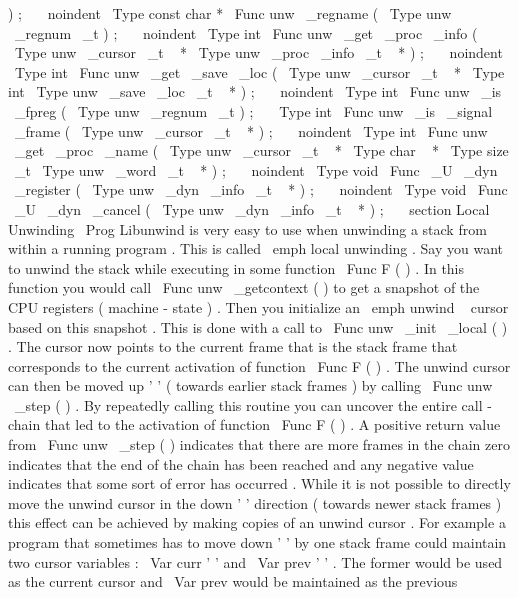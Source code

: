 )
;
\
\
\
noindent
\
Type
{
const
char
*
}
\
Func
{
unw
\
_regname
}
(
\
Type
{
unw
\
_regnum
\
_t
}
)
;
\
\
\
noindent
\
Type
{
int
}
\
Func
{
unw
\
_get
\
_proc
\
_info
}
(
\
Type
{
unw
\
_cursor
\
_t
~
*
}
\
Type
{
unw
\
_proc
\
_info
\
_t
~
*
}
)
;
\
\
\
noindent
\
Type
{
int
}
\
Func
{
unw
\
_get
\
_save
\
_loc
}
(
\
Type
{
unw
\
_cursor
\
_t
~
*
}
\
Type
{
int
}
\
Type
{
unw
\
_save
\
_loc
\
_t
~
*
}
)
;
\
\
\
noindent
\
Type
{
int
}
\
Func
{
unw
\
_is
\
_fpreg
}
(
\
Type
{
unw
\
_regnum
\
_t
}
)
;
\
\
\
Type
{
int
}
\
Func
{
unw
\
_is
\
_signal
\
_frame
}
(
\
Type
{
unw
\
_cursor
\
_t
~
*
}
)
;
\
\
\
noindent
\
Type
{
int
}
\
Func
{
unw
\
_get
\
_proc
\
_name
}
(
\
Type
{
unw
\
_cursor
\
_t
~
*
}
\
Type
{
char
~
*
}
\
Type
{
size
\
_t
}
\
Type
{
unw
\
_word
\
_t
~
*
}
)
;
\
\
\
noindent
\
Type
{
void
}
\
Func
{
\
_U
\
_dyn
\
_register
}
(
\
Type
{
unw
\
_dyn
\
_info
\
_t
~
*
}
)
;
\
\
\
noindent
\
Type
{
void
}
\
Func
{
\
_U
\
_dyn
\
_cancel
}
(
\
Type
{
unw
\
_dyn
\
_info
\
_t
~
*
}
)
;
\
\
\
section
{
Local
Unwinding
}
\
Prog
{
Libunwind
}
is
very
easy
to
use
when
unwinding
a
stack
from
within
a
running
program
.
This
is
called
\
emph
{
local
}
unwinding
.
Say
you
want
to
unwind
the
stack
while
executing
in
some
function
\
Func
{
F
}
(
)
.
In
this
function
you
would
call
\
Func
{
unw
\
_getcontext
}
(
)
to
get
a
snapshot
of
the
CPU
registers
(
machine
-
state
)
.
Then
you
initialize
an
\
emph
{
unwind
~
cursor
}
based
on
this
snapshot
.
This
is
done
with
a
call
to
\
Func
{
unw
\
_init
\
_local
}
(
)
.
The
cursor
now
points
to
the
current
frame
that
is
the
stack
frame
that
corresponds
to
the
current
activation
of
function
\
Func
{
F
}
(
)
.
The
unwind
cursor
can
then
be
moved
up
'
'
(
towards
earlier
stack
frames
)
by
calling
\
Func
{
unw
\
_step
}
(
)
.
By
repeatedly
calling
this
routine
you
can
uncover
the
entire
call
-
chain
that
led
to
the
activation
of
function
\
Func
{
F
}
(
)
.
A
positive
return
value
from
\
Func
{
unw
\
_step
}
(
)
indicates
that
there
are
more
frames
in
the
chain
zero
indicates
that
the
end
of
the
chain
has
been
reached
and
any
negative
value
indicates
that
some
sort
of
error
has
occurred
.
While
it
is
not
possible
to
directly
move
the
unwind
cursor
in
the
down
'
'
direction
(
towards
newer
stack
frames
)
this
effect
can
be
achieved
by
making
copies
of
an
unwind
cursor
.
For
example
a
program
that
sometimes
has
to
move
down
'
'
by
one
stack
frame
could
maintain
two
cursor
variables
:
\
Var
{
curr
}
'
'
and
\
Var
{
prev
}
'
'
.
The
former
would
be
used
as
the
current
cursor
and
\
Var
{
prev
}
would
be
maintained
as
the
previous
